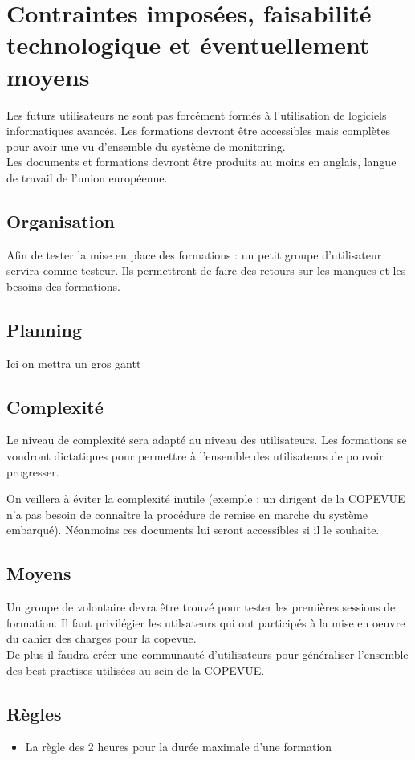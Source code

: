 \section{Contraintes imposées, faisabilité technologique et éventuellement moyens}

Les futurs utilisateurs ne sont pas forcément formés à l'utilisation de 
logiciels informatiques avancés. Les formations devront être accessibles mais 
complètes pour avoir une vu d'ensemble du système de monitoring. \\

Les documents et formations devront être produits au moins en anglais, langue
de travail de l'union européenne. 


\subsection{Organisation}

Afin de tester la mise en place des formations : un petit groupe d'utilisateur
servira comme testeur. Ils permettront de faire des retours sur les manques et 
les besoins des formations. 

\subsection{Planning}

Ici on mettra un gros gantt

\subsection{Complexité}

Le niveau de complexité sera adapté au niveau des utilisateurs. Les formations
se voudront dictatiques pour permettre à l'ensemble des utilisateurs de pouvoir
progresser.

On veillera à éviter la complexité inutile (exemple : un dirigent de la COPEVUE
n'a pas besoin de connaître la procédure de remise en marche du système embarqué). 
Néanmoins ces documents lui seront accessibles si il le souhaite.

\subsection{Moyens}

Un groupe de volontaire devra être trouvé pour tester les premières sessions de
formation. Il faut privilégier les utilsateurs qui ont participés à la mise en
oeuvre du cahier des charges pour la copevue. \\

De plus il faudra créer une communauté d'utilisateurs pour généraliser l'ensemble
des best-practises utilisées au sein de la COPEVUE.


\subsection{Règles}

\begin{itemize}
	\item La règle des 2 heures pour la durée maximale d'une formation
\end{itemize}

